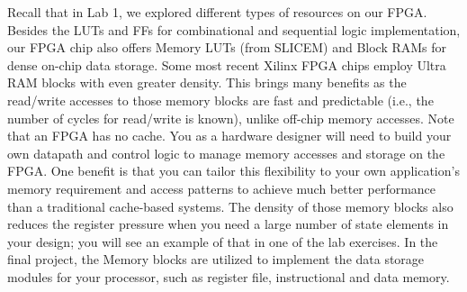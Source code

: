 \documentclass[11pt]{article}
\begin{document}
Recall that in Lab 1, we explored different types of resources on our FPGA. Besides the LUTs and FFs for combinational and sequential logic implementation, our FPGA chip also offers Memory LUTs (from SLICEM) and Block RAMs for dense on-chip data storage. Some most recent Xilinx FPGA chips employ Ultra RAM blocks with even greater density. This brings many benefits as the read/write accesses to those memory blocks are fast and predictable (i.e., the number of cycles for read/write is known), unlike off-chip memory accesses. Note that an FPGA has no cache. You as a hardware designer will need to build your own datapath and control logic to manage memory accesses and storage on the FPGA. One benefit is that you can tailor this flexibility to your own application's memory requirement and access patterns to achieve much better performance than a traditional cache-based systems. The density of those memory blocks also reduces the register pressure when you need a large number of state elements in your design; you will see an example of that in one of the lab exercises. In the final project, the Memory blocks are utilized to implement the data storage modules for your processor, such as register file, instructional and data memory.
\end{document}

